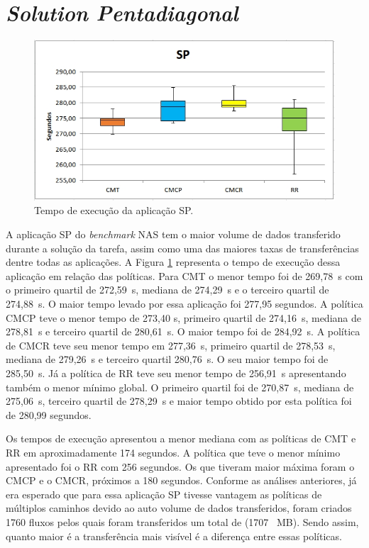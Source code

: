 \section{\textit{Solution Pentadiagonal}}
\label{sec:sp}
\begin{figure}[!htb]
	\caption{\label{fig:sp}Tempo de execução da aplicação SP.}
	\begin{center}
	    \includegraphics[scale=0.60]{imagens/sp.jpg}
	\end{center}
\end{figure}
A aplicação SP do \textit{benchmark} NAS tem o maior volume de dados transferido durante a solução da tarefa, assim como uma das maiores taxas de transferências dentre todas as aplicações. A  Figura \ref{fig:sp} representa o tempo de execução dessa aplicação em relação das políticas. Para CMT o menor tempo foi de 269,78~s com o primeiro quartil de 272,59~s, mediana de 274,29~s e o terceiro quartil de 274,88~s. O maior tempo levado por essa aplicação foi 277,95 segundos. A política CMCP teve o menor tempo de 273,40 s, primeiro quartil de 274,16~s, mediana de 278,81~s e terceiro quartil de 280,61~s. O maior tempo foi de 284,92~s. 
A política de CMCR teve seu menor tempo em 277,36~s, primeiro quartil de 278,53~s, mediana de 279,26~s e terceiro quartil 280,76~s. O seu maior tempo foi de 285,50~s. Já a política de RR teve seu menor tempo de 256,91~s apresentando também o menor mínimo global. O primeiro quartil foi de 270,87~s, mediana de 275,06~s, terceiro quartil de 278,29~s e maior tempo obtido por esta política foi de 280,99 segundos.

Os tempos de execução apresentou a menor mediana com as políticas de CMT e RR em aproximadamente 174 segundos. A política que teve o menor mínimo apresentado foi o RR com 256 segundos. Os que tiveram maior máxima foram o CMCP e o CMCR, próximos a 180 segundos. Conforme as análises anteriores, já era esperado que para essa aplicação SP tivesse vantagem as políticas de múltiplos caminhos devido ao auto volume de dados transferidos, foram criados 1760 fluxos pelos quais foram transferidos um total de (1707~ MB). Sendo assim, quanto maior é a transferência mais visível é a diferença entre essas políticas.



